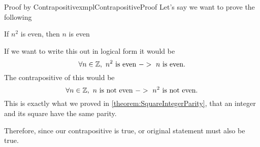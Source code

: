 \begin{exmpl}[label={exmpl:ContrapositiveProof}]{Proof by Contrapositive}{xmplContrapositiveProof}
    Let's say we want to prove the following
    \begin{center}
        If $n^2$ is even, then $n$ is even
    \end{center}
    If we want to write this out in logical form it would be
    $$\forall n \in \mathbb{Z}, \text{ $n^2$ is even } -> \text{ $n$ is even.}$$
    The contrapositive of this would be
    $$\forall n \in \mathbb{Z}, \text{ $n$ is not even } -> \text{ $n^2$ is not even.}$$
    This is exactly what we proved in \cref{theorem:SquareIntegerParity}, that an integer and its square have the same parity.

    Therefore, since our contrapositive is true, or original statement must also be true.
\end{exmpl}